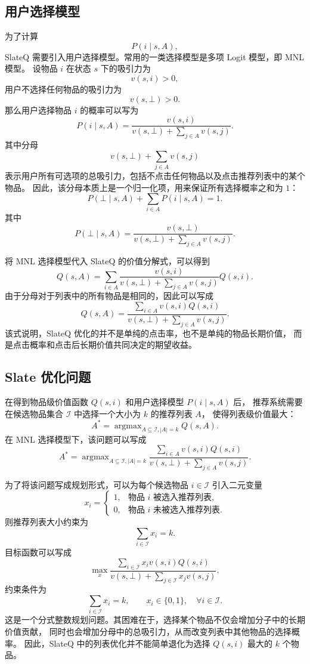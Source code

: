 \documentclass[11pt]{ctexart}
\begin{document}
\subsection{用户选择模型}

为了计算
\[
P(i\mid s,A),
\]
SlateQ 需要引入用户选择模型。常用的一类选择模型是多项 Logit 模型，即 MNL 模型。
设物品 $i$ 在状态 $s$ 下的吸引力为
\[
v(s,i)>0,
\]
用户不选择任何物品的吸引力为
\[
v(s,\bot)>0.
\]
那么用户选择物品 $i$ 的概率可以写为
\[
P(i\mid s,A)
=
\frac{v(s,i)}
{v(s,\bot)+\sum_{j\in A}v(s,j)}.
\]
其中分母
\[
v(s,\bot)+\sum_{j\in A}v(s,j)
\]
表示用户所有可选项的总吸引力，包括不点击任何物品以及点击推荐列表中的某个物品。
因此，该分母本质上是一个归一化项，用来保证所有选择概率之和为 $1$：
\[
P(\bot\mid s,A)+\sum_{i\in A}P(i\mid s,A)=1.
\]
其中
\[
P(\bot\mid s,A)
=
\frac{v(s,\bot)}
{v(s,\bot)+\sum_{j\in A}v(s,j)}.
\]

将 MNL 选择模型代入 SlateQ 的价值分解式，可以得到
\[
Q(s,A)
=
\sum_{i\in A}
\frac{v(s,i)}
{v(s,\bot)+\sum_{j\in A}v(s,j)}
Q(s,i).
\]
由于分母对于列表中的所有物品是相同的，因此可以写成
\[
Q(s,A)
=
\frac{
\sum_{i\in A}v(s,i)Q(s,i)
}{
v(s,\bot)+\sum_{j\in A}v(s,j)
}.
\]
该式说明，SlateQ 优化的并不是单纯的点击率，也不是单纯的物品长期价值，
而是点击概率和点击后长期价值共同决定的期望收益。

\subsection{Slate 优化问题}

在得到物品级价值函数 $Q(s,i)$ 和用户选择模型 $P(i\mid s,A)$ 后，
推荐系统需要在候选物品集合 $\mathcal{I}$ 中选择一个大小为 $k$ 的推荐列表 $A$，
使得列表级价值最大：
\[
A^*
=
\mathop{\arg\max}_{A\subseteq \mathcal{I}, |A|=k}
Q(s,A).
\]
在 MNL 选择模型下，该问题可以写成
\[
A^*
=
\mathop{\arg\max}_{A\subseteq \mathcal{I}, |A|=k}
\frac{
\sum_{i\in A}v(s,i)Q(s,i)
}{
v(s,\bot)+\sum_{j\in A}v(s,j)
}.
\]

为了将该问题写成规划形式，可以为每个候选物品 $i\in\mathcal{I}$ 引入二元变量
\[
x_i=
\begin{cases}
1, & \text{物品 } i \text{ 被选入推荐列表},\\
0, & \text{物品 } i \text{ 未被选入推荐列表}.
\end{cases}
\]
则推荐列表大小约束为
\[
\sum_{i\in\mathcal{I}}x_i=k.
\]
目标函数可以写成
\[
\max_{x}
\frac{
\sum_{i\in\mathcal{I}}x_i v(s,i)Q(s,i)
}{
v(s,\bot)+\sum_{j\in\mathcal{I}}x_j v(s,j)
},
\]
约束条件为
\[
\sum_{i\in\mathcal{I}}x_i=k,
\qquad
x_i\in\{0,1\}, \quad \forall i\in\mathcal{I}.
\]
这是一个分式整数规划问题。其困难在于，选择某个物品不仅会增加分子中的长期价值贡献，
同时也会增加分母中的总吸引力，从而改变列表中其他物品的选择概率。
因此，SlateQ 中的列表优化并不能简单退化为选择 $Q(s,i)$ 最大的 $k$ 个物品。
\end{document}
